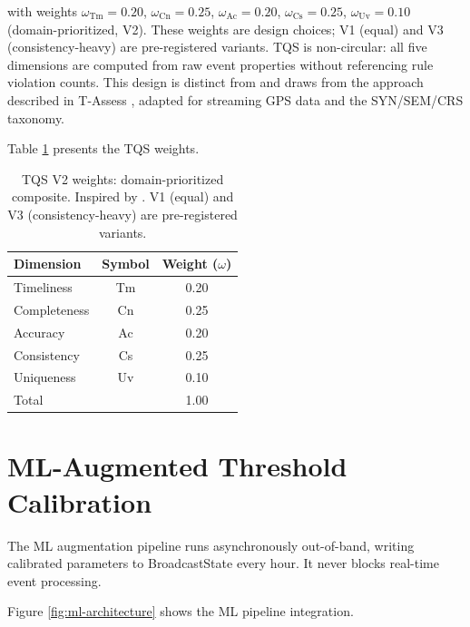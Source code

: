 with weights $\omega_{\text{Tm}} = 0.20$, $\omega_{\text{Cn}} = 0.25$,
$\omega_{\text{Ac}} = 0.20$, $\omega_{\text{Cs}} = 0.25$, $\omega_{\text{Uv}} = 0.10$
(domain-prioritized, V2). These weights are design choices; V1 (equal) and
V3 (consistency-heavy) are pre-registered variants. TQS is non-circular:
all five dimensions are computed from raw event properties without referencing
rule violation counts. This design is distinct from and draws from the
approach described in T-Assess \citep{tassess2025}, adapted for streaming
GPS data and the SYN/SEM/CRS taxonomy.

Table \ref{tab:tqs-weights} presents the TQS weights.

\begin{table}[htbp]
  \centering
  \caption{TQS V2 weights: domain-prioritized composite. Inspired by
    \citep{tassess2025}. V1 (equal) and V3 (consistency-heavy) are
    pre-registered variants.}
  \label{tab:tqs-weights}
  \begin{tabular}{lcc}
    \toprule
    Dimension & Symbol & Weight ($\omega$) \\
    \midrule
    Timeliness     & Tm & 0.20 \\
    Completeness   & Cn & 0.25 \\
    Accuracy       & Ac & 0.20 \\
    Consistency    & Cs & 0.25 \\
    Uniqueness     & Uv & 0.10 \\
    \midrule
    Total          &    & 1.00 \\
    \bottomrule
  \end{tabular}
\end{table}

\section{ML-Augmented Threshold Calibration}
\label{sec:ml-augmentation}

The ML augmentation pipeline runs asynchronously out-of-band, writing
calibrated parameters to BroadcastState every hour. It never blocks
real-time event processing.

Figure \ref{fig:ml-architecture} shows the ML pipeline integration.

